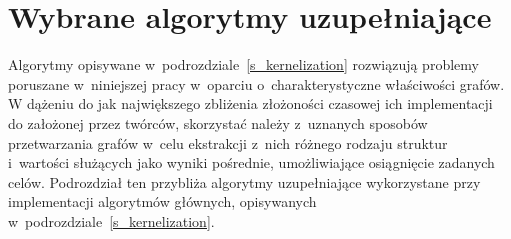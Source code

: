 \section{Wybrane algorytmy uzupełniające}\label{s_supplementary_algorithms}
\par{
  Algorytmy opisywane w~podrozdziale~\ref{s_kernelization} rozwiązują problemy poruszane w~niniejszej pracy w~oparciu o~charakterystyczne właściwości grafów.
  W dążeniu do jak największego zbliżenia złożoności czasowej ich implementacji do założonej przez twórców, skorzystać należy z~uznanych sposobów przetwarzania grafów w~celu ekstrakcji z~nich różnego rodzaju struktur i~wartości służących jako wyniki pośrednie, umożliwiające osiągnięcie zadanych celów.
  Podrozdział ten przybliża algorytmy uzupełniające wykorzystane przy implementacji algorytmów głównych, opisywanych w~podrozdziale~\ref{s_kernelization}.
}


